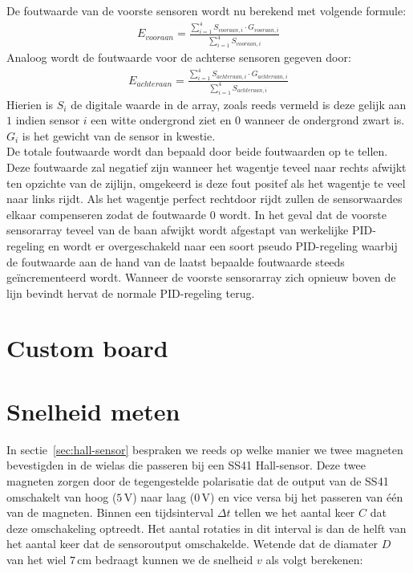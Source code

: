 De foutwaarde van de voorste sensoren wordt nu berekend met volgende formule:
\begin{gather*}
E_{vooraan} = \frac{\sum\limits_{i=1}^{4}S_{vooraan,i}\cdot G_{vooraan,i}}{\sum\limits_{i=1}^{4}S_{vooraan,i}}
\end{gather*}
Analoog wordt de foutwaarde voor de achterse sensoren gegeven door:
\begin{gather*}
E_{achteraan} = \frac{\sum\limits_{i=1}^{4}S_{achteraan,i}\cdot G_{achteraan,i}}{\sum\limits_{i=1}^{4}S_{achteraan,i}}
\end{gather*}
Hierien is $S_i$ de digitale waarde in de array, zoals reeds vermeld is deze gelijk aan $1$ indien sensor $i$ een witte ondergrond ziet en $0$ wanneer de ondergrond zwart is. $G_i$ is het gewicht van de sensor in kwestie.\\
De totale foutwaarde wordt dan bepaald door beide foutwaarden op te tellen. Deze foutwaarde zal negatief zijn wanneer het wagentje teveel naar rechts afwijkt ten opzichte van de zijlijn, omgekeerd is deze fout positef als het wagentje te veel naar links rijdt. Als het wagentje perfect rechtdoor rijdt zullen de sensorwaardes elkaar compenseren zodat de foutwaarde $0$ wordt. In het geval dat de voorste sensorarray teveel van de baan afwijkt wordt afgestapt van werkelijke PID-regeling en wordt er overgeschakeld naar een soort pseudo PID-regeling waarbij de foutwaarde aan de hand van de laatst bepaalde foutwaarde steeds ge\"incrementeerd wordt. Wanneer de voorste sensorarray zich opnieuw boven de lijn bevindt hervat de normale PID-regeling terug.

\section{Custom board}
\section{Snelheid meten}
In sectie~\vref{sec:hall-sensor} bespraken we reeds op welke manier we twee magneten bevestigden in de wielas die passeren bij een SS41 Hall-sensor.
Deze twee magneten zorgen door de tegengestelde polarisatie dat de output van de SS41 omschakelt van hoog ($5\,\mathrm{V}$) naar laag ($0\,\mathrm{V}$) en vice versa bij het passeren van \'e\'en van de magneten. 
Binnen een tijdsinterval $\Delta t$ tellen we het aantal keer $C$ dat deze omschakeling optreedt. Het aantal rotaties in dit interval is dan de helft van het aantal keer dat de sensoroutput omschakelde. Wetende dat de diamater $D$ van het wiel $7\,\mathrm{cm}$ bedraagt kunnen we de snelheid $v$ als volgt berekenen:

